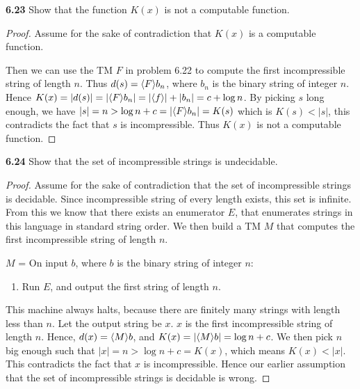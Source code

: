 \textbf{6.23} Show that the function $K(x)$ is not a computable function.
\begin{mdframed}
\begin{proof}
Assume for the sake of contradiction that $K(x)$ is a computable function.

Then we can use the TM $F$ in problem 6.22 to compute the first incompressible string of length $n$. Thus $d(s) = \langle{F}\rangle b_n$, where $b_n$ is the binary string of integer $n$. Hence $K(x) = |d(s)| = |\langle{F}\rangle b_n| = |\langle{f}\rangle| + |b_n| = c + \log n$. By picking $s$ long enough, we have $|s| = n > \log n + c = |\langle{F}\rangle b_n| = K(s)$ which is $K(s) < |s|$, this contradicts the fact that $s$ is incompressible. Thus $K(x)$ is not a computable function.
\end{proof}
\end{mdframed}

\textbf{6.24} Show that the set of incompressible strings is undecidable.
\begin{mdframed}
\begin{proof}
Assume for the sake of contradiction that the set of incompressible strings is decidable. Since incompressible string of every length exists, this set is infinite. From this we know that there exists an enumerator $E$, that enumerates strings in this language in standard string order. We then build a TM $M$ that computes the first incompressible string of length $n$.

\medskip
$M$ = On input $b$, where $b$ is the binary string of integer $n$:
\begin{enumerate}
\item Run $E$, and output the first string of length $n$.
\end{enumerate}

This machine always halts, because there are finitely many strings with length less than $n$. Let the output string be $x$. $x$ is the first incompressible string of length $n$. Hence, $d(x) = \langle{M}\rangle b$, and $K(x) = |\langle{M}\rangle b| = \log n + c$. We then pick $n$ big enough such that $|x| = n > \log n + c = K(x)$, which means $K(x) < |x|$. This contradicts the fact that $x$ is incompressible. Hence our earlier assumption that the set of incompressible strings is decidable is wrong.
\end{proof}
\end{mdframed}

